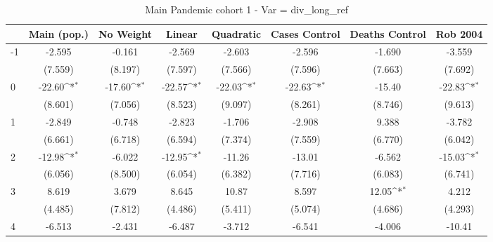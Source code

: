 \documentclass{article}
\begin{document}
{
\def\sym#1{\ifmmode^{#1}\else\(^{#1}\)\fi}
\begin{longtable}{l*{7}{c}}
\caption{Main Pandemic cohort 1 - Var = div\_long\_ref}\\
\hline\hline\endfirsthead\hline\endhead\hline\endfoot\endlastfoot
                &\multicolumn{1}{c}{Main (pop.)}&\multicolumn{1}{c}{No Weight}&\multicolumn{1}{c}{Linear}&\multicolumn{1}{c}{Quadratic}&\multicolumn{1}{c}{Cases Control}&\multicolumn{1}{c}{Deaths Control}&\multicolumn{1}{c}{Rob 2004}\\
\hline
-1              &   -2.595         &   -0.161         &   -2.569         &   -2.603         &   -2.596         &   -1.690         &   -3.559         \\
                &  (7.559)         &  (8.197)         &  (7.597)         &  (7.566)         &  (7.596)         &  (7.663)         &  (7.692)         \\
0               &   -22.60\sym{*}  &   -17.60\sym{*}  &   -22.57\sym{*}  &   -22.03\sym{*}  &   -22.63\sym{*}  &   -15.40         &   -22.83\sym{*}  \\
                &  (8.601)         &  (7.056)         &  (8.523)         &  (9.097)         &  (8.261)         &  (8.746)         &  (9.613)         \\
1               &   -2.849         &   -0.748         &   -2.823         &   -1.706         &   -2.908         &    9.388         &   -3.782         \\
                &  (6.661)         &  (6.718)         &  (6.594)         &  (7.374)         &  (7.559)         &  (6.770)         &  (6.042)         \\
2               &   -12.98\sym{*}  &   -6.022         &   -12.95\sym{*}  &   -11.26         &   -13.01         &   -6.562         &   -15.03\sym{*}  \\
                &  (6.056)         &  (8.500)         &  (6.054)         &  (6.382)         &  (7.716)         &  (6.083)         &  (6.741)         \\
3               &    8.619         &    3.679         &    8.645         &    10.87         &    8.597         &    12.05\sym{*}  &    4.212         \\
                &  (4.485)         &  (7.812)         &  (4.486)         &  (5.411)         &  (5.074)         &  (4.686)         &  (4.293)         \\
4               &   -6.513         &   -2.431         &   -6.487         &   -3.712         &   -6.541         &   -4.006         &   -10.41         \\

\end{longtable}}
\end{document}
